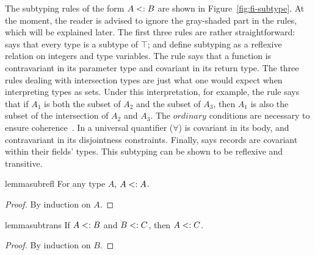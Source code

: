 The subtyping rules of the form $A <: B$ are shown in 
Figure~\ref{fig:fi-subtype}. 
At the moment, the reader is advised to ignore the
gray-shaded part in the rules, which will be explained later. 
The first three rules are rather straightforward: 
says that every type is a subtype of $\top$;  and 
 define subtyping as a reflexive relation on integers and
type variables.
The rule  says that a function is contravariant in 
its parameter type and covariant in its return type. 
The three rules dealing with intersection types are just what one would expect 
when interpreting types as sets. 
Under this interpretation, for example, the rule 
says that if $A_1$ is both the subset of $A_2$ and the subset of $A_3$, then
$A_1$ is also the subset of the intersection of $A_2$ and $A_3$.
The $ordinary$ conditions are necessary to ensure coherence~\cite{icfppaper}.
In  a universal quantifier ($\forall$) 
is covariant in its body, and contravariant in its disjointness constraints.
Finally,  says records are covariant within their fields' types.
This subtyping can be shown to be reflexive and transitive.

\begin{restatable}{lemma}{subrefl}
  \label{lemma:subrefl}
  For any type $A$, $A <: A$.
\end{restatable}

\begin{proof}
By induction on $A$.
\end{proof}

\begin{restatable}{lemma}{subtrans}
  \label{lemma:subtrans}
  If $A <: B$ and $B <: C$, then $A <: C$.
\end{restatable}

\begin{proof}
By induction on $B$. 
\end{proof}


%
%

